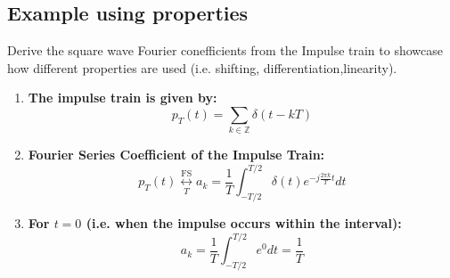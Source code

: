 \subsection{Example using properties}
\begin{example}
    Derive the square wave Fourier conefficients from the Impulse train to showcase how different properties are used (i.e. shifting, differentiation,linearity).
    \begin{enumerate}

        \item \textbf{The impulse train is given by:}
        \[
        p_T(t) = \sum_{k \in \mathbb{Z}} \delta(t - kT)
        \]

        \begin{center}
        \end{center}
        
        \item \textbf{Fourier Series Coefficient of the Impulse Train:}
        \[
        p_T(t) \underset{T}{\overset{\text{FS}}{\longleftrightarrow}} a_k = \frac{1}{T} \int_{-T/2}^{T/2} \delta(t) e^{-j\frac{2\pi k}{T}t} dt
        \]
    
        \item \textbf{For \( t = 0 \) (i.e. when the impulse occurs within the interval):}
        \[
        a_k = \frac{1}{T} \int_{-T/2}^{T/2} e^0 dt = \frac{1}{T}
        \]


\end{enumerate}
\end{example}

